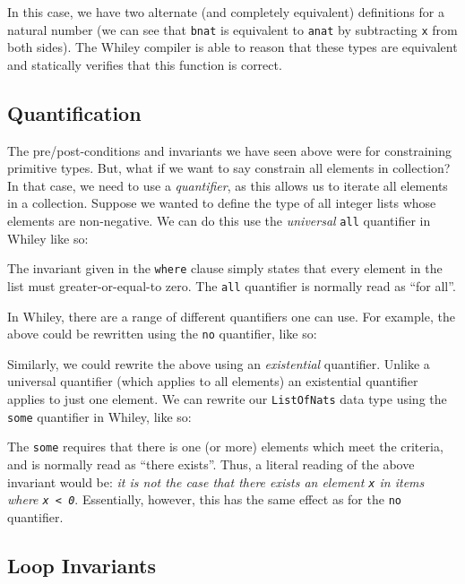 In this case, we have two alternate (and completely equivalent)
definitions for a natural number (we can see that \lstinline{bnat} is
equivalent to \lstinline{anat} by subtracting \lstinline{x} from both sides).
The Whiley compiler is able to reason that these types are equivalent
and statically verifies that this function is correct.

\subsection{Quantification}
The pre/post-conditions and invariants we have seen above were for constraining primitive types.  But, what if we want to say constrain all elements in collection?  In that case, we need to use a {\em quantifier}, as this allows us to iterate all elements in a collection.  Suppose we wanted to define the type of all integer lists whose elements are non-negative.  We can do this use the {\em universal} \lstinline{all} quantifier in Whiley like so:



The invariant given in the \lstinline{where} clause simply states that every element in the list must greater-or-equal-to zero.  The \lstinline{all} quantifier is normally read as ``for all''.

In Whiley, there are a range of different quantifiers one can use.  For example, the above could be rewritten using the \lstinline{no} quantifier, like so:



Similarly, we could rewrite the above using an {\em existential} quantifier.  Unlike a universal quantifier (which applies to all elements) an existential quantifier applies to just one element.  We can rewrite our \lstinline{ListOfNats} data type using the \lstinline{some} quantifier in Whiley, like so:



The \lstinline{some} requires that there is one (or more) elements which meet the criteria, and is normally read as ``there exists''.  Thus, a literal reading of the above invariant would be: {\em it is not the case that there exists an element \lstinline{x} in items where \lstinline{x < 0}}.  Essentially, however, this has the same effect as for the \lstinline{no} quantifier.  

\subsection{Loop Invariants}
\label{loop_invariants}

